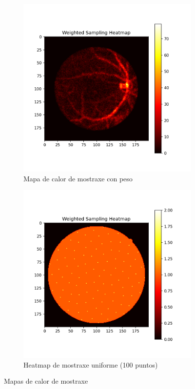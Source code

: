\begin{figure}[ht]
\begin{subfigure}[b]{0.3\textwidth}
        \includegraphics[width=\textwidth]{imaxes/muestraje/weighted_sampling_heatmap.png}
        \caption{Mapa de calor de mostraxe con peso}
        \label{fig:weighted_sampling_heatmap}
    \end{subfigure}
    \hfill
    \begin{subfigure}[b]{0.3\textwidth}
        \centering
        \includegraphics[width=\textwidth]{imaxes/muestraje/uniform_sampling_heatmap.png}
        \caption{Heatmap de mostraxe uniforme (100 puntos)}
        \label{fig:uniform_sampling_heatmap}
    \end{subfigure}
    \caption{Mapas de calor de mostraxe}
    \label{fig:sampling_heatmaps}
\end{figure}

